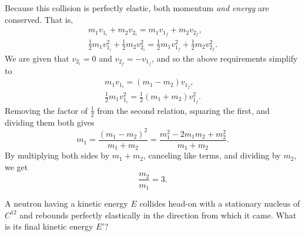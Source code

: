 \documentclass[../feynman-lectures-on-physics.tex]{subfiles}
\begin{document}
\begin{questions}
	\begin{solution}
		Because this collision is perfectly elastic, both momentum \textit{and
		energy} are conserved. That is,
		\begin{gather*}
			m_1v_{1_i} + m_2v_{2_i} = m_1v_{1_f} + m_2v_{2_f}, \\
			\frac{1}{2}m_1v_{1_i}^2 + \frac{1}{2}m_2v_{2_i}^2 =
			\frac{1}{2}m_1v_{1_f}^2 + \frac{1}{2}m_2v_{2_f}^2.
		\end{gather*}
		We are given that $v_{2_i} = 0$ and $v_{2_f} = -v_{1_f}$, and so the above
		requirements simplify to
		\begin{gather*}
			m_1v_{1_i} = (m_1-m_2)v_{1_f}, \\
			\frac{1}{2}m_1v_{1_i}^2 = \frac{1}{2}(m_1+m_2)v_{1_f}^2.
		\end{gather*}
		Removing the factor of $\frac{1}{2}$ from the second relation, squaring
		the first, and dividing them both gives
		\[
			m_1 = \frac{(m_1-m_2)^2}{m_1+m_2} = \frac{m_1^2 - 2m_1m_2 + m_2^2}{m_1+m_2}.
		\]
		By multiplying both sides by $m_1 + m_2$, canceling like terms, and
		dividing by $m_2$, we get
		\[
			\frac{m_2}{m_1} = 3.
		\]
	\end{solution}

	\question A neutron having a kinetic energy $E$ collides head-on with a
	stationary nucleus of $C^{12}$ and rebounds perfectly elastically in the
	direction from which it came. What is its final kinetic energy $E'$?


\end{questions}
\end{document}
